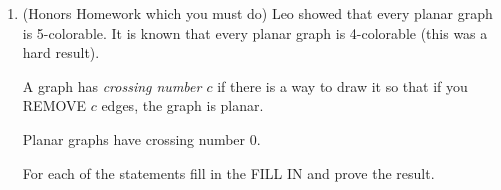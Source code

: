 \documentclass[12pt]{article}
\newcommand{\D}{{\mathbb D}}
\newcommand{\N}{{\mathbb N}}
\newcommand{\R}{{\mathbb R}}
\newcommand{\succc}{{\rm succ}}
\newcommand{\pred}{{\rm pred}}
\begin{document}
\begin{enumerate}
\begin{enumerate}
\begin{itemize}
\end{itemize}


\item
(15 points) 
Find a set $\D\subseteq\R$ such that the following all hold:

\begin{itemize}
\item
Every element $x\in \D$ has both a successor element $\succc(x)$ (so $x<\succc(x)$ 
and there is nothing strictly between $x$ and $\succc(x)$)
and a predecessor element $\pred(x)$ (so $\pred(x)<x$ and there is nothing strictly
inbetween $\pred(x)$ and $x$). 
\item 
There exists an infinite number of pairs $(x_1, y_1), (x_2, y_2), \ldots \in D$ such that,
for all $i\in\N$: 

1)  $x_1 < y_1$ and $\succc(x_1) \neq y_1$, $\succc(\succc(x_1)), \neq y_1, \ldots$ 
 
2) $x_2 < y_2$ and $\succc(x_2) \neq y_2$, $\succc(\succc(x_2)), \neq y_2, \ldots$  \\ \vdots

i) $x_i < y_i$ and $\succc(x_i) \neq y_i$, $\succc(\succc(x_i)), \neq y_i, \ldots$ \\ \vdots

and so on 

\item \textbf{Once again, the set Z of integers satisifies this. We need a set where every element has a successor and predecessor, and there are infinitely many pairs of elements where the gap between elements is at least 3. As the set of integers is not dense and it is infinite, it satisfies this condition.}

\end{itemize}
\end{enumerate}

\vfill

\centerline{\bf GO TO NEXT PAGE}

\newpage

\item 
(Honors Homework which you must do)
Leo showed that every planar graph is 5-colorable.
It is known that every planar graph is 4-colorable
(this was a hard result).

A graph has {\it crossing number $c$} if there is a way
to draw it so that if you REMOVE $c$ edges, the graph is planar.

Planar graphs have crossing number 0.

For each of the statements fill in the FILL IN and prove the
result. 


\end{enumerate}
\end{document}
